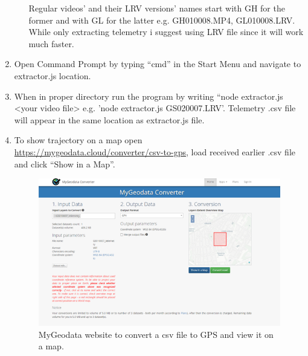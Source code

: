 \documentclass[a4paper,12pt]{article}
\begin{document}
\begin{enumerate}
\begin{enumerate}
		Regular videos’ and their LRV versions’ names start with GH for the former and with GL for the latter e.g. GH010008.MP4, GL010008.LRV. \\
		While only extracting telemetry i suggest using LRV file since it will work much faster.
	\end{enumerate}
	\item Open Command Prompt by typing “cmd” in the Start Menu and navigate to extractor.js location.
	\item When in proper directory run the program by writing “node extractor.js <your video file> e.g. 'node extractor.js GS020007.LRV'. Telemetry .csv file will appear in the same location as extractor.js file.
	\pagebreak
	\item To show trajectory on a map open \\ 
	\url{https://mygeodata.cloud/converter/csv-to-gps}, load received earlier .csv file and click “Show in a Map”.
	\begin{figure}[H]
		\centering
		\includegraphics{Map_page}
		\caption{MyGeodata website to convert a csv file to GPS and view it on a map.}
	\end{figure}
\end{enumerate}
 
\end{document}

